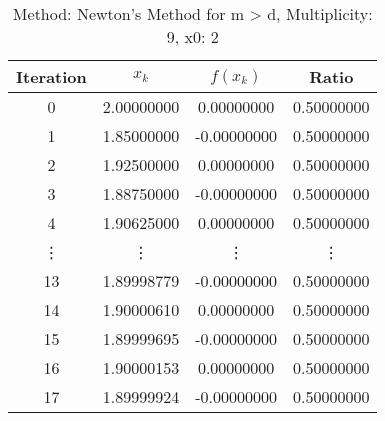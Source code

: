 \begin{table}
\centering
\caption{Method: Newton's Method for m > d, Multiplicity: 9, x0: 2}
\label{tab:table_Newton's_Method_for_m_>_d_9_2}
\begin{tabular}{c c c c}
\toprule
Iteration &      $x_k$ &    $f(x_k)$ &      Ratio \\
\midrule
        0 & 2.00000000 &  0.00000000 & 0.50000000 \\
        1 & 1.85000000 & -0.00000000 & 0.50000000 \\
        2 & 1.92500000 &  0.00000000 & 0.50000000 \\
        3 & 1.88750000 & -0.00000000 & 0.50000000 \\
        4 & 1.90625000 &  0.00000000 & 0.50000000 \\
   \vdots &     \vdots &      \vdots &     \vdots \\
       13 & 1.89998779 & -0.00000000 & 0.50000000 \\
       14 & 1.90000610 &  0.00000000 & 0.50000000 \\
       15 & 1.89999695 & -0.00000000 & 0.50000000 \\
       16 & 1.90000153 &  0.00000000 & 0.50000000 \\
       17 & 1.89999924 & -0.00000000 & 0.50000000 \\
\bottomrule
\end{tabular}
\end{table}
